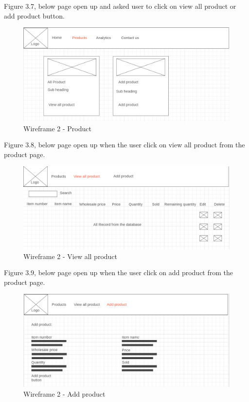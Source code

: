 Figure 3.7, below page open up and asked user to click on view all product or add product button. 
\begin{figure}[H]
\centering
    \includegraphics[scale=0.5]
    {wireframe2/product2.png}
    \caption{Wireframe 2 - Product}
    \label{fig:Wireframe 2 - Product}
\end{figure}

Figure 3.8, below page open up when the user click on view all product from the product page. 
\begin{figure}[H]
\centering
    \includegraphics[scale=0.5]
    {wireframe2/viewallproduct.png}
    \caption{Wireframe 2 - View all product}
    \label{fig:Wireframe 2 - view all product}
\end{figure}

\newpage
Figure 3.9, below page open up when the user click on add product from the product page. 
\begin{figure}[H]
\centering
    \includegraphics[scale=0.5]
    {wireframe2/addproduct.png}
    \caption{Wireframe 2 - Add product}
    \label{fig:Wireframe 2 - Add  product}
\end{figure}


